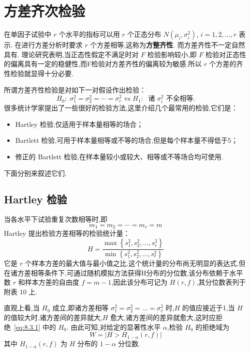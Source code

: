 \section{方差齐次检验}\label{sec:8.3}
在单因子试验中 $r$ 个水平的指标可以用 $r$ 个正态分布 $N(\mu_i,\sigma_i^2)$, $i=1,2,\ldots,r$ 表示. 在进行方差分析时要求 $r$ 个方差相等,这称为\textbf{方整齐性}. 而方差齐性不一定自然具有. 理论研究表明,当正态性假定不满足时对 $F$ 检验影响较小,即 $F$ 检验对正态性的偏离具有一定的稳健性,而F检验对方差齐性的偏离较为敏感.所以 $r$ 个方差的齐性检验就显得十分必要.

所谓方差齐性检验是对如下一对假设作出检验：
\begin{equation}\label{eq:8.3.1}
  H_0:\; \sigma_1^2 = \sigma_2^2 = \cdots = \sigma_r^2 \text{ vs } H_1:\; \text{ 诸 } \sigma_i^2 \text{ 不全相等}.
\end{equation}
很多统计学家提出了一些很好的检验方法,这里介绍几个最常用的检验,它们是：
\begin{itemize}
  \item Hartley 检验,仅适用于样本量相等的场合；
  \item Bartlett 检验,可用于样本量相等或不等的场合,但是每个样本量不得低于5；
  \item 修正的 Bartlett 检验,在样本量较小或较大、相等或不等场合均可使用.
\end{itemize}

下面分别来叙述它们.
\subsection{Hartley 检验}

当各水平下试验重复次数相等时,即
\begin{equation*}
  m_{1}=m_{2}=\cdots=m_{r}=m
\end{equation*}
Hartley 提出检验方差相等的检验统计量：
\begin{equation}\label{eq:8.3.2}
  H=\frac{\max \left\{s_{1}^{2}, s_{2}^{2}, \ldots, s_{r}^{2}\right\}}{\min \left\{s_{1}^{2}, s_{2}^{2}, \ldots, s_{r}^{2}\right\}}
\end{equation}
它是 $r$ 个样本方差的最大值与最小值之比.这个统计量的分布尚无明显的表达式,但在诸方差相等条件下,可通过随机模拟方法获得H分布的分位数,该分布依赖于水平数 $r$ 和样本方差的自由度 $f=m-1$,因此该分布可记为 $H(r,f)$,其分位数表列于附表 10 上.

直观上看,当 $H_0$ 成立,即诸方差相等 $\sigma_1^2 = \sigma_2^2= \ldots = \sigma_r^2$ 时,$H$ 的值应接近于1,当 $H$ 的值较大时,诸方差间的差异就大,$H$ 愈大,诸方差间的差异就愈大,这时应拒绝~\eqref{eq:8.3.1} 中的 $H_0$. 由此可知,对给定的显著性水平 $\alpha$,检验 $H_0$ 的拒绝域为
\begin{equation}
  W=|H>H_{1-\alpha}(r, f)|
\end{equation}
其中 $H_{1-\alpha}(r,f)$ 为 $H$ 分布的 $1-\alpha$ 分位数.

